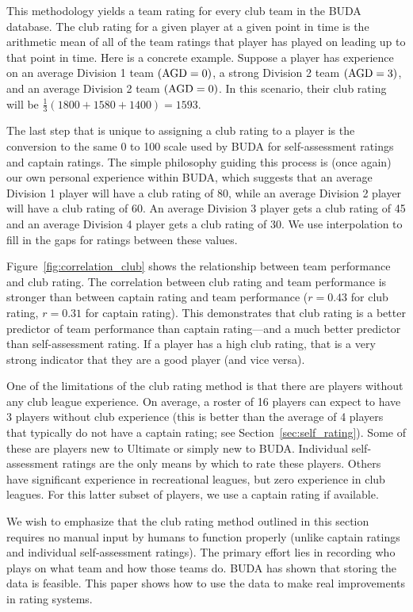 This methodology yields a team rating for every club team in the BUDA database.  The club rating for a given player at a given point in time is the arithmetic mean of all of the team ratings that player has played on leading up to that point in time.  Here is a concrete example.  Suppose a player has experience on an average Division 1 team $({\rm AGD} = 0)$, a strong Division 2 team $({\rm AGD} = 3)$, and an average Division 2 team $({\rm AGD} = 0)$.  In this scenario, their club rating will be $\frac{1}{3}(1800 + 1580 + 1400) = 1593$.

The last step that is unique to assigning a club rating to a player is the conversion to the same 0 to 100 scale used by BUDA for self-assessment ratings and captain ratings.  The simple philosophy guiding this process is (once again) our own personal experience within BUDA, which suggests that an average Division 1 player will have a club rating of 80, while an average Division 2 player will have a club rating of 60. An average Division 3 player gets a club rating of 45 and an average Division 4 player gets a club rating of 30. We use interpolation to fill in the gaps for ratings between these values.

Figure~\ref{fig:correlation_club} shows the relationship between team performance and club rating. The correlation between club rating and team performance is stronger than between captain rating and team performance ($r = 0.43$ for club rating, $r = 0.31$ for captain rating). This demonstrates that club rating is a better predictor of team performance than captain rating---and a much better predictor than self-assessment rating. If a player has a high club rating, that is a very strong indicator that they are a good player (and vice versa).

One of the limitations of the club rating method is that there are players without any club league experience.  On average, a roster of 16 players can expect to have 3 players without club experience (this is better than the average of 4 players that typically do not have a captain rating; see Section~\ref{sec:self_rating}). Some of these are players new to Ultimate or simply new to BUDA. Individual self-assessment ratings are the only means by which to rate these players. Others have significant experience in recreational leagues, but zero experience in club leagues. For this latter subset of players, we use a captain rating if available. 

We wish to emphasize that the club rating method outlined in this section requires no manual input by humans to function properly (unlike captain ratings and individual self-assessment ratings).  The primary effort lies in recording who plays on what team and how those teams do.  BUDA has shown that storing the data is feasible. This paper shows how to use the data to make real improvements in rating systems.

